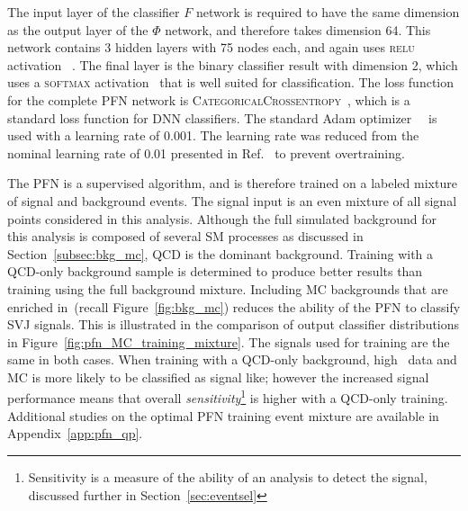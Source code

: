 The input layer of the classifier $F$ network is required to have the same dimension as the output layer of the $\Phi$ network, and therefore takes dimension 64. This network contains 3 hidden layers with 75 nodes each, and again uses \textsc{relu} activation~\cite{scikit-learn} . The final layer is the binary classifier result with dimension 2, which uses a \textsc{softmax} activation~\cite{scikit-learn} that is well suited for classification. The loss function for the complete PFN network is \textsc{CategoricalCrossentropy}~\cite{scikit-learn}, which is a standard loss function for DNN classifiers. The standard Adam optimizer~\cite{adam}~\cite{scikit-learn} is used with a learning rate of 0.001. The learning rate was reduced from the nominal learning rate of 0.01 presented in Ref.~\cite{pfn} to prevent overtraining.\par

The PFN is a supervised algorithm, and is therefore trained on a labeled mixture of signal and background events. The signal input is an even mixture of all signal points considered in this analysis. Although the full simulated background for this analysis is composed of several SM processes as discussed in Section~\ref{subsec:bkg_mc}, QCD is the dominant background. Training with a QCD-only background sample is determined to produce better results than training using the full background mixture. Including MC backgrounds that are enriched in~\met (recall Figure~\ref{fig:bkg_mc}) reduces the ability of the PFN to classify SVJ signals. This is illustrated in the comparison of output classifier distributions in Figure~\ref{fig:pfn_MC_training_mixture}. The signals used for training are the same in both cases. When training with a QCD-only background, high \met~data and MC is more likely to be classified as signal like; however the increased signal performance means that overall \textit{sensitivity}\footnote{Sensitivity is a measure of the ability of an analysis to detect the signal, discussed further in Section~\ref{sec:eventsel}} is higher with a QCD-only training. Additional studies on the optimal PFN training event mixture are available in Appendix~\ref{app:pfn_qp}. \par


